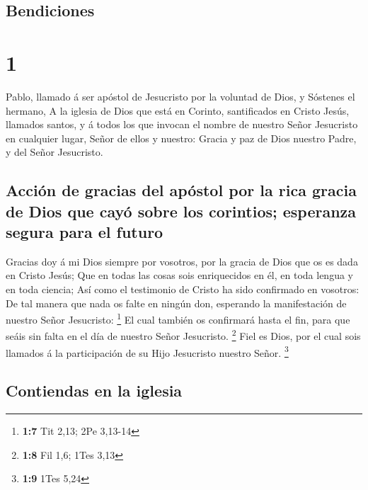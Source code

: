 \hypertarget{bendiciones}{%
\subsection{Bendiciones}\label{bendiciones}}

\hypertarget{section}{%
\section{1}\label{section}}

 Pablo, llamado á ser apóstol de Jesucristo por la voluntad
de Dios, y Sóstenes el hermano,  A la iglesia de Dios que
está en Corinto, santificados en Cristo Jesús, llamados santos, y á
todos los que invocan el nombre de nuestro Señor Jesucristo en cualquier
lugar, Señor de ellos y nuestro:  Gracia y paz de Dios
nuestro Padre, y del Señor Jesucristo.

\hypertarget{acciuxf3n-de-gracias-del-apuxf3stol-por-la-rica-gracia-de-dios-que-cayuxf3-sobre-los-corintios-esperanza-segura-para-el-futuro}{%
\subsection{Acción de gracias del apóstol por la rica gracia de Dios que
cayó sobre los corintios; esperanza segura para el
futuro}\label{acciuxf3n-de-gracias-del-apuxf3stol-por-la-rica-gracia-de-dios-que-cayuxf3-sobre-los-corintios-esperanza-segura-para-el-futuro}}

 Gracias doy á mi Dios siempre por vosotros, por la gracia
de Dios que os es dada en Cristo Jesús;  Que en todas las
cosas sois enriquecidos en él, en toda lengua y en toda ciencia;
 Así como el testimonio de Cristo ha sido confirmado en
vosotros:  De tal manera que nada os falte en ningún don,
esperando la manifestación de nuestro Señor Jesucristo: \footnote{\textbf{1:7}
  Tit 2,13; 2Pe 3,13-14}  El cual también os confirmará
hasta el fin, para que seáis sin falta en el día de nuestro Señor
Jesucristo. \footnote{\textbf{1:8} Fil 1,6; 1Tes 3,13}  Fiel
es Dios, por el cual sois llamados á la participación de su Hijo
Jesucristo nuestro Señor. \footnote{\textbf{1:9} 1Tes 5,24}

\hypertarget{contiendas-en-la-iglesia}{%
\subsection{Contiendas en la iglesia}\label{contiendas-en-la-iglesia}}

